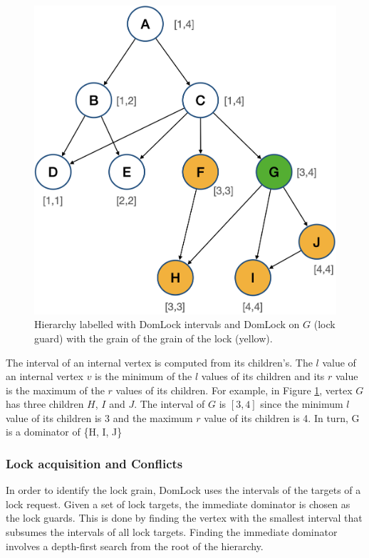 \begin{figure}
    \centering
    \captionsetup{justification=centering}
    \includegraphics[width=.6\textwidth]{figures/domlock_example_with_lock.png}
    \caption{Hierarchy labelled with DomLock intervals and DomLock on $G$ (lock guard) with the grain of the grain of the lock (yellow).}
    \label{fig:domlock_example_locked}
\end{figure}

The interval of an internal vertex is computed from its children's. The $l$ value of an internal vertex $v$ is the minimum of the $l$ values of its children and its $r$ value is the maximum of the $r$ values of its children. For example, in Figure \ref{fig:domlock_example_locked}, vertex $G$ has three children $H$, $I$ and $J$. The interval of $G$ is $[3,4]$ since the minimum $l$ value of its children is 3 and the maximum $r$ value of its children is 4.  In turn, G is a dominator of \{H, I, J\}

\subsubsection{Lock acquisition and Conflicts}

In order to identify the lock grain, DomLock uses the intervals of the targets of a lock request. Given a set of lock targets, the immediate dominator is chosen as the lock guards. This is done by finding the vertex with the smallest interval that subsumes the intervals of all lock targets.
Finding the immediate dominator involves a depth-first search from the root of the hierarchy.  

